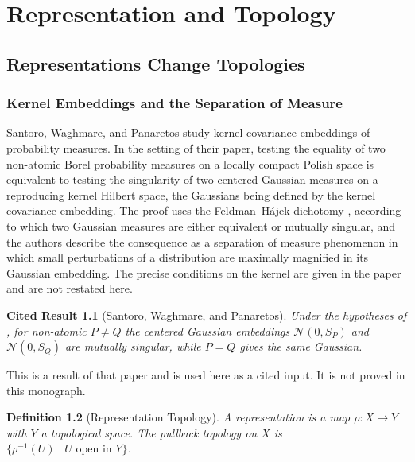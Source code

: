 \documentclass[12pt,oneside,openany]{book}
\theoremstyle{spherepop}
\newtheorem{definition}{Definition}[chapter]
\theoremstyle{remarkstyle}
\newtheorem{fact}[definition]{Cited Result}
\begin{document}
\part{Representation and Topology}

\chapter{Representations Change Topologies}
\label{ch:repr}

\section{Kernel Embeddings and the Separation of Measure}

Santoro, Waghmare, and Panaretos \cite{swp} study kernel covariance embeddings of probability measures. In the setting of their paper, testing the equality of two non-atomic Borel probability measures on a locally compact Polish space is equivalent to testing the singularity of two centered Gaussian measures on a reproducing kernel Hilbert space, the Gaussians being defined by the kernel covariance embedding. The proof uses the Feldman--Hájek dichotomy \cite{feldman,hajek}, according to which two Gaussian measures are either equivalent or mutually singular, and the authors describe the consequence as a separation of measure phenomenon in which small perturbations of a distribution are maximally magnified in its Gaussian embedding. The precise conditions on the kernel are given in the paper and are not restated here.

\begin{fact}[Santoro, Waghmare, and Panaretos]
\label{fact:swp}
Under the hypotheses of \cite{swp}, for non-atomic $P\ne Q$ the centered Gaussian embeddings $\mathcal N(0,S_P)$ and $\mathcal N(0,S_Q)$ are mutually singular, while $P=Q$ gives the same Gaussian.
\end{fact}

This is a result of that paper and is used here as a cited input. It is not proved in this monograph.

\begin{definition}[Representation Topology]
A \emph{representation} is a map $\rho:X\to Y$ with $Y$ a topological space. The \emph{pullback topology} on $X$ is $\{\rho^{-1}(U)\mid U\text{ open in }Y\}$.
\end{definition}
\end{document}
